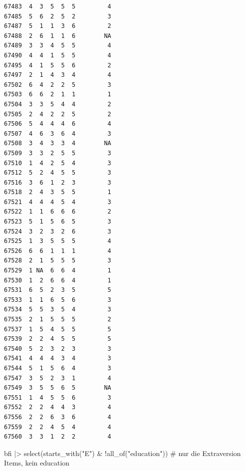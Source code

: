 \documentclass[
  letterpaper,
  DIV=11,
  numbers=noendperiod]{scrreprt}
\newenvironment{Shaded}{\begin{snugshade}}{\end{snugshade}}
\newcommand{\CommentTok}[1]{\textcolor[rgb]{0.37,0.37,0.37}{#1}}
\newcommand{\FunctionTok}[1]{\textcolor[rgb]{0.28,0.35,0.67}{#1}}
\newcommand{\NormalTok}[1]{\textcolor[rgb]{0.00,0.23,0.31}{#1}}
\newcommand{\SpecialCharTok}[1]{\textcolor[rgb]{0.37,0.37,0.37}{#1}}
\newcommand{\StringTok}[1]{\textcolor[rgb]{0.13,0.47,0.30}{#1}}
\begin{document}
\begin{verbatim}
67483  4  3  5  5  5         4
67485  5  6  2  5  2         3
67487  5  1  1  3  6         2
67488  2  6  1  1  6        NA
67489  3  3  4  5  5         4
67490  4  4  1  5  5         4
67495  4  1  5  5  6         2
67497  2  1  4  3  4         4
67502  6  4  2  2  5         3
67503  6  6  2  1  1         1
67504  3  3  5  4  4         2
67505  2  4  2  2  5         2
67506  5  4  4  4  6         4
67507  4  6  3  6  4         3
67508  3  4  3  3  4        NA
67509  3  3  2  5  5         3
67510  1  4  2  5  4         3
67512  5  2  4  5  5         3
67516  3  6  1  2  3         3
67518  2  4  3  5  5         1
67521  4  4  4  5  4         3
67522  1  1  6  6  6         2
67523  5  1  5  6  5         3
67524  3  2  3  2  6         3
67525  1  3  5  5  5         4
67526  6  6  1  1  1         4
67528  2  1  5  5  5         3
67529  1 NA  6  6  4         1
67530  1  2  6  6  4         1
67531  6  5  2  3  5         5
67533  1  1  6  5  6         3
67534  5  5  3  5  4         3
67535  2  1  5  5  5         2
67537  1  5  4  5  5         5
67539  2  2  4  5  5         5
67540  5  2  3  2  3         3
67541  4  4  4  3  4         3
67544  5  1  5  6  4         3
67547  3  5  2  3  1         4
67549  3  5  5  6  5        NA
67551  1  4  5  5  6         3
67552  2  2  4  4  3         4
67556  2  2  6  3  6         4
67559  2  2  4  5  4         4
67560  3  3  1  2  2         4
\end{verbatim}

\begin{Shaded}
\begin{Highlighting}[]
\NormalTok{bfi }\SpecialCharTok{|\textgreater{}} \FunctionTok{select}\NormalTok{(}\FunctionTok{starts\_with}\NormalTok{(}\StringTok{"E"}\NormalTok{) }\SpecialCharTok{\&} \SpecialCharTok{!}\FunctionTok{all\_of}\NormalTok{(}\StringTok{"education"}\NormalTok{)) }\CommentTok{\# nur die Extraversion Items, kein education}
\end{Highlighting}
\end{Shaded}
\end{document}
